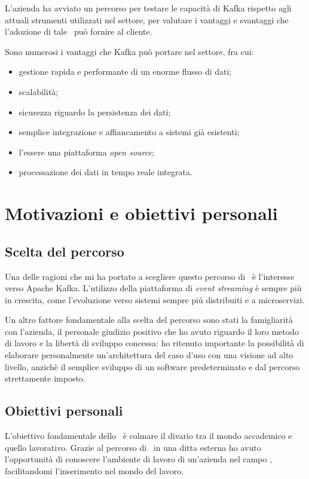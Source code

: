 L'azienda ha avviato un percorso per testare le capacità di Kafka rispetto agli attuali strumenti utilizzati nel settore, per valutare i vantaggi e svantaggi che l'adozione di tale \software\ può fornire al cliente.

\noindent
Sono numerosi i vantaggi che Kafka può portare nel settore, fra cui:
\begin{itemize}
  \item gestione rapida e performante di un enorme flusso di dati;
  \item scalabilità;
  \item sicurezza riguardo la persistenza dei dati;
  \item semplice integrazione e affiancamento a sistemi già esistenti;
  \item l'essere una piattaforma \textit{open source};
  \item processazione dei dati in tempo reale integrata.
\end{itemize}


\section{Motivazioni e obiettivi personali}

\subsection{Scelta del percorso}

Una delle ragioni che mi ha portato a scegliere questo percorso di \stage\ è l'interesse verso Apache Kafka.
L'utilizzo della piattaforma di \textit{event streaming} è sempre più in crescita, come l'evoluzione verso sistemi sempre più distribuiti e a microservizi.

Un altro fattore fondamentale alla scelta del percorso sono stati la famigliarità con l'azienda, il personale giudizio positivo che ho avuto riguardo il loro metodo di lavoro e la libertà di sviluppo concessa: ho ritenuto importante la possibilità di elaborare personalmente un'architettura del caso d'uso con una visione ad alto livello, anzichè il semplice sviluppo di un software predeterminato e dal percorso strettamente imposto.

\subsection{Obiettivi personali}
L'obiettivo fondamentale dello \stage\ è colmare il divario tra il mondo accademico e quello lavorativo.
Grazie al percorso di \stage\ in una ditta esterna ho avuto l'opportunità di conoscere l'ambiente di lavoro di un'azienda nel campo , facilitandomi l'inserimento nel mondo del lavoro.

